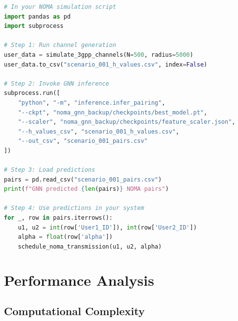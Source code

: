 \documentclass[12pt,a4paper]{article}
\begin{document}
\begin{lstlisting}[language=Python]
# In your NOMA simulation script
import pandas as pd
import subprocess

# Step 1: Run channel generation
user_data = simulate_3gpp_channels(N=500, radius=5000)
user_data.to_csv("scenario_001_h_values.csv", index=False)

# Step 2: Invoke GNN inference
subprocess.run([
    "python", "-m", "inference.infer_pairing",
    "--ckpt", "noma_gnn_backup/checkpoints/best_model.pt",
    "--scaler", "noma_gnn_backup/checkpoints/feature_scaler.json",
    "--h_values_csv", "scenario_001_h_values.csv",
    "--out_csv", "scenario_001_pairs.csv"
])

# Step 3: Load predictions
pairs = pd.read_csv("scenario_001_pairs.csv")
print(f"GNN predicted {len(pairs)} NOMA pairs")

# Step 4: Use predictions in your system
for _, row in pairs.iterrows():
    u1, u2 = int(row['User1_ID']), int(row['User2_ID'])
    alpha = float(row['alpha'])
    schedule_noma_transmission(u1, u2, alpha)
\end{lstlisting}

\section{Performance Analysis}

\subsection{Computational Complexity}
\end{document}
